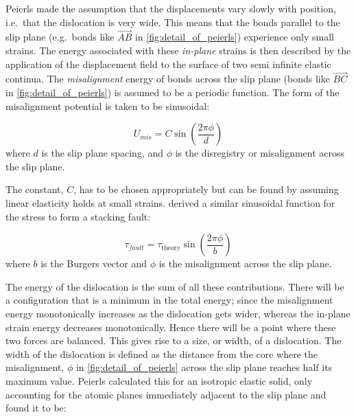 Peierls made the assumption that the displacements vary slowly with position, i.e.\ that the dislocation is very wide. This means that the bonds parallel to the slip plane (e.g.\ bonds like $\overrightarrow{AB}$ in \autoref{fig:detail_of_peierls}) experience only small strains. The energy associated with these \emph{in-plane} strains is then described  by the application of the displacement field to the surface of two semi infinite elastic continua. 
The \emph{misalignment} energy of bonds across the slip plane (bonds like $\overrightarrow{BC}$ in \autoref{fig:detail_of_peierls}) is assumed to be a periodic function. The form of the misalignment potential is taken to be sinusoidal:

\begin{equation}
U_{mis} = C \sin \left(\frac{2\pi \phi}{d} \right) \label{eqn:Frenkel_approx}
\end{equation}
where $d$ is the slip plane spacing, and $\phi$ is the disregistry or misalignment across the slip plane.














%
%
%
%
%
%
%
%
%
%





The constant, $C$, has to be chosen appropriately but can be found by assuming linear elasticity holds at small strains. \citet{Frenkel1926} derived a similar sinusoidal function for the stress to form a stacking fault:










\begin{equation}
\tau_{fault} = \tau_{\text{theory}} \sin \left( \frac{2\pi \phi}{b} \right)
\end{equation}
where $b$ is the Burgers vector and $\phi$ is the misalignment across the slip plane.

The energy of the dislocation is the sum of all these contributions. There will be a configuration that is a minimum in the total energy; since the misalignment energy monotonically increases as the dislocation gets wider, whereas the in-plane strain energy decreases monotonically. Hence there will be a point where these two forces are balanced. This gives rise to a size, or width, of a dislocation. The width of the dislocation is defined as the distance from the core where the misalignment, $\phi$ in \ref{fig:detail_of_peierls} across the slip plane reaches half its maximum value. Peierls calculated this for an isotropic elastic solid, only accounting for the atomic planes immediately adjacent to the slip plane and found it to be:

